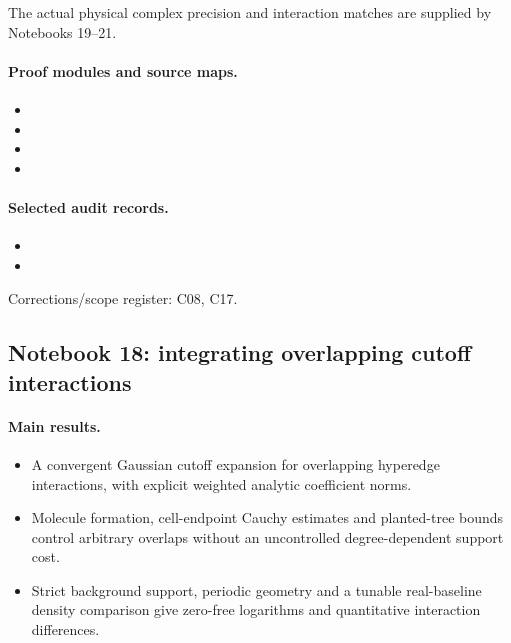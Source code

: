 \documentclass[11pt]{article}
\theoremstyle{remark}
\begin{document}
The actual physical complex precision and interaction matches are supplied by Notebooks 19--21.

\paragraph{Proof modules and source maps.}
\begingroup\small
\begin{itemize}
\item {}
\item {}
\item {}
\item {}
\end{itemize}
\endgroup

\paragraph{Selected audit records.}
\begingroup\small
\begin{itemize}
\item {}
\item {}
\end{itemize}
\endgroup
Corrections/scope register: C08, C17.\par

\subsection{Notebook 18: integrating overlapping cutoff interactions}
\label{hnc-18}
\noindent{}\par

\paragraph{Main results.}
\begin{itemize}
\item A convergent Gaussian cutoff expansion for overlapping hyperedge interactions, with explicit weighted analytic coefficient norms.
\item Molecule formation, cell-endpoint Cauchy estimates and planted-tree bounds control arbitrary overlaps without an uncontrolled degree-dependent support cost.
\item Strict background support, periodic geometry and a tunable real-baseline density comparison give zero-free logarithms and quantitative interaction differences.
\end{itemize}
\end{document}
